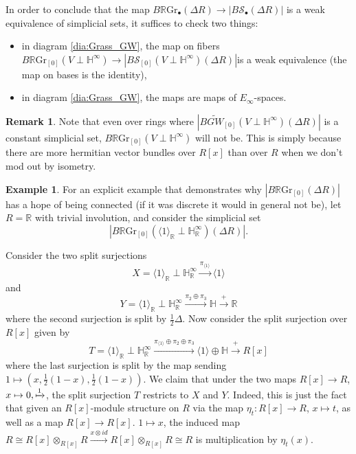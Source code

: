 \documentclass[draftthesis,tocnosub,noragright,centerchapter,10pt]{uiucthesis2009}
\newcommand{\mbb}{\mathbb}
\newcommand{\mc}{\mathcal}
\newcommand{\RGr}{\mathbb R\mathrm{Gr}}
\theoremstyle{plain}
\theoremstyle{definition}
\newtheorem{example}[lemma]{Example}
\newtheorem{remark}[lemma]{Remark}
\begin{document}
In order to conclude that the map $B\RGr_\bullet(\Delta R) \rightarrow
|B \mc S_\bullet (\Delta R)|$ is a weak equivalence of simplicial
sets, it suffices to check two things:
\begin{itemize}
\item in diagram \ref{dia:Grass_GW}, the map on fibers $B\RGr_{[0]}(V
  \perp \mbb H^\infty) \rightarrow |B\mc S_{[0]}(V \perp \mbb H^\infty)(\Delta R)| $is a weak
  equivalence (the map on bases is the identity),
\item in diagram \ref{dia:Grass_GW}, the maps are maps of
  $E_\infty$-spaces.
\end{itemize}

\begin{remark}
Note that even over rings where $|B\widetilde{GW}_{[0]}(V\perp \mbb H^\infty)(\Delta R)|$ is
a constant simplicial set, $B\RGr_{[0]}(V \perp \mbb H^\infty)$ will
not be. This is simply because there are more hermitian vector bundles over
$R[x]$ than over $R$ when we don't mod out by isometry. 

\end{remark}

\begin{example}
For an
explicit example that demonstrates why $|B\RGr_{[0]}(\Delta
R)|$ has a hope of being connected (if it was discrete it would in
general not be), let $R = \mbb R$ with trivial involution, and
consider the simplicial set
\[
|B\RGr_{[0]}(\langle 1 \rangle_{\mbb R} \perp \mbb H_{\mbb R}^\infty)(\Delta R)|.
\]

Consider the two split surjections
\[
X = \langle 1 \rangle_{\mbb R} \perp \mbb H_{\mbb R}^\infty
\xrightarrow{\pi_{\langle 1 \rangle}} \langle 1 \rangle
\]
and
\[
Y = \langle 1 \rangle_{\mbb R} \perp \mbb H_{\mbb R}^\infty
\xrightarrow{\pi_2 \oplus \pi_3} \mbb H \xrightarrow{+} \mbb R
\]
where the second surjection is split by $\frac{1}{2}\Delta$. 
Now consider the split surjection over $R[x]$ given by
\[
T = \langle 1 \rangle_{\mbb R} \perp \mbb H_{\mbb R}^\infty
\xrightarrow{\pi_{\langle 1 \rangle} \oplus \pi_2 \oplus \pi_3}
\langle 1 \rangle \oplus \mbb H \xrightarrow{+} R[x]
\]
where the last surjection is split by the map sending $1 \mapsto
(x,\frac{1}{2}(1-x),\frac{1}{2}(1-x))$. We claim
that under the two maps $R[x] \rightarrow R$, $x \mapsto 0, \xmapsto
1$, the split surjection $T$ restricts to $X$ and $Y$. Indeed, this is
just the fact that given an $R[x]$-module structure on $R$ via the map
$\eta_t: R[x] \rightarrow R$, $x \mapsto t$, as well as a map $R[x]
\rightarrow R[x]$. $1 \mapsto x$, 
the induced map $R \cong R[x]\otimes_{R[x]} R \xrightarrow{x \otimes id} R[x] \otimes_{R[x]}
R \cong R$ is multiplication by $\eta_t(x)$.
\end{example}
\end{document}
